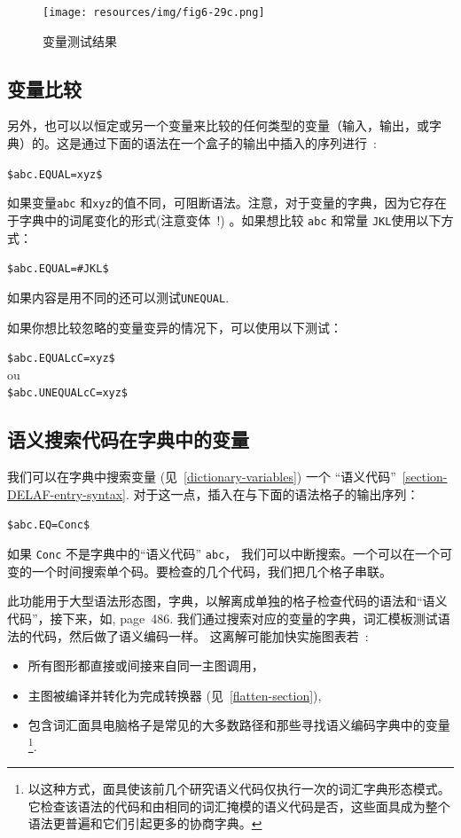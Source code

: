 \begin{figure}[!ht]
\begin{center}
\texttt{[image: resources/img/fig6-29c.png]}
\caption{变量测试结果\label{fig-testing-a-variable-results}}
\end{center}
\end{figure}


\subsection{变量比较}
另外，也可以以恒定或另一个变量来比较的任何类型的变量（输入，输出，或字典）的。这是通过下面的语法在一个盒子的输出中插入的序列进行~:


\bigskip
\noindent \verb+$abc.EQUAL=xyz$+

\bigskip
\noindent 如果变量\verb+abc+ 和\verb+xyz+的值不同，可阻断语法。注意，对于变量的字典，因为它存在于字典中的词尾变化的形式(注意变体~!) 。如果想比较 \verb+abc+ 和常量 \verb+JKL+使用以下方式：

\bigskip
\noindent \verb+$abc.EQUAL=#JKL$+

\bigskip
\noindent 如果内容是用不同的还可以测试\verb+UNEQUAL+.

\bigskip
\noindent 如果你想比较忽略的变量变异的情况下，可以使用以下测试：

\bigskip
\noindent \verb+$abc.EQUALcC=xyz$+ \\
ou \\
\verb+$abc.UNEQUALcC=xyz$+

\subsection{语义搜索代码在字典中的变量}
我们可以在字典中搜索变量 
(见~\ref{dictionary-variables}) 一个 ``语义代码''~\ref{section-DELAF-entry-syntax}.
对于这一点，插入在与下面的语法格子的输出序列：

\bigskip
\noindent \verb+$abc.EQ=Conc$+

\bigskip
\noindent 如果 \verb+Conc+ 不是字典中的``语义代码'' \verb+abc+， 我们可以中断搜索。一个可以在一个可变的一个时间搜索单个码。要检查的几个代码，我们把几个格子串联。

\bigskip
\noindent 此功能用于大型语法形态图，字典，以解离成单独的格子检查代码的语法和``语义代码''，接下来，如\cite{paumier_nam_2014}, page~486.
我们通过搜索对应的变量的字典，词汇模板测试语法的代码，然后做了语义编码一样。
这离解可能加快实施图表若~:
\begin{itemize}
\item 所有图形都直接或间接来自同一主图调用，
\item 主图被编译并转化为完成转换器 (见~\ref{flatten-section}),
\item 包含词汇面具电脑格子是常见的大多数路径和那些寻找语义编码字典中的变量\footnote{以这种方式，面具使该前几个研究语义代码仅执行一次的词汇字典形态模式。
它检查该语法的代码和由相同的词汇掩模的语义代码是否，这些面具成为整个语法更普遍和它们引起更多的协商字典。}.
\end{itemize}

